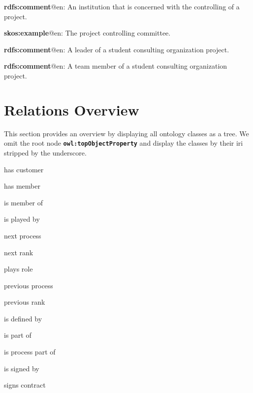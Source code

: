 \documentclass[a4paper, DIV=13, BCOR=0cm]{scrbook}
\newcommand{\class}[1]{\texttt{\textbf{#1}}}
\begin{document}
\begin{mdframed}[style=onto-3, frametitle={Project Controlling}]
	{%
		\begin{compactitem}
			\item \textbf{rdfs:comment}@en: An institution that is concerned with the controlling of a project.
			\item \textbf{skos:example}@en: The project controlling committee.
		\end{compactitem}
	} %
\end{mdframed}

\begin{mdframed}[style=onto-3, frametitle={Project Team Leader}]
	{%
		\begin{compactitem}
			\item \textbf{rdfs:comment}@en: A leader of a student consulting organization project.
		\end{compactitem}
	} %
\end{mdframed}

\begin{mdframed}[style=onto-3, frametitle={Project Team Member}]
	{%
		\begin{compactitem}
			\item \textbf{rdfs:comment}@en: A team member of a student consulting organization project.
		\end{compactitem}
	} %
\end{mdframed}


\section{Relations Overview}
This section provides an overview by displaying all ontology classes as a tree. 
We omit the root node \class{owl:topObjectProperty} and display the classes 
by their \gls{iri} stripped by the underscore.
\begin{compactitem}
	\item has customer
	\item has member
	\item is member of
	\item is played by
	\item next process
	\item next rank
	\item plays role
	\item previous process
	\item previous rank
	\item is defined by
	\item is part of
	\item is process part of
	\item is signed by
	\item signs contract
\end{compactitem}
\end{document}
